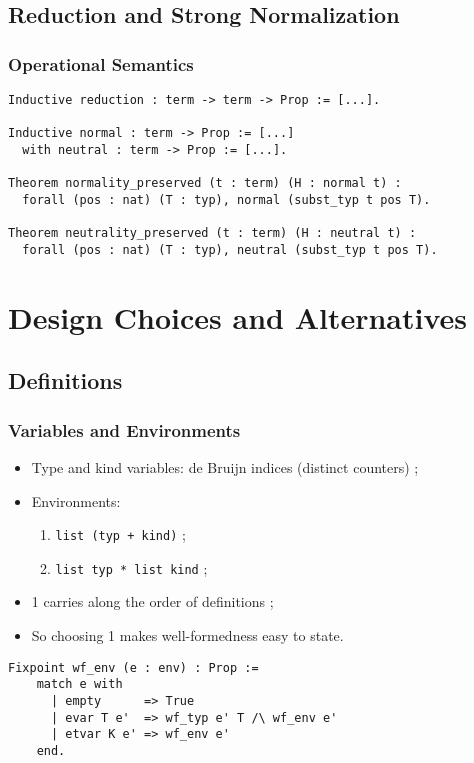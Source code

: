 \documentclass{beamer}
\begin{document}
\subsection{Reduction and Strong Normalization}

\begin{frame}[fragile]

\frametitle{Operational Semantics}

\begin{verbatim}
Inductive reduction : term -> term -> Prop := [...].

Inductive normal : term -> Prop := [...]
  with neutral : term -> Prop := [...].

Theorem normality_preserved (t : term) (H : normal t) :
  forall (pos : nat) (T : typ), normal (subst_typ t pos T).

Theorem neutrality_preserved (t : term) (H : neutral t) :
  forall (pos : nat) (T : typ), neutral (subst_typ t pos T).
\end{verbatim}


\end{frame}

\section{Design Choices and Alternatives}

\subsection{Definitions}

\begin{frame}[fragile]

\frametitle{Variables and Environments}

\begin{itemize}
\item Type and kind variables: de Bruijn indices (distinct
  counters) ;
\item Environments:
  \begin{enumerate}
    \item \verb|list (typ + kind)| ;
    \item \verb|list typ * list kind| ;
  \end{enumerate}
\item 1 carries along the order of definitions ;
\item So choosing 1 makes well-formedness easy to state.
\end{itemize}

\begin{verbatim}
Fixpoint wf_env (e : env) : Prop :=
    match e with
      | empty      => True
      | evar T e'  => wf_typ e' T /\ wf_env e'
      | etvar K e' => wf_env e'
    end.
\end{verbatim}

\end{frame}
\end{document}
